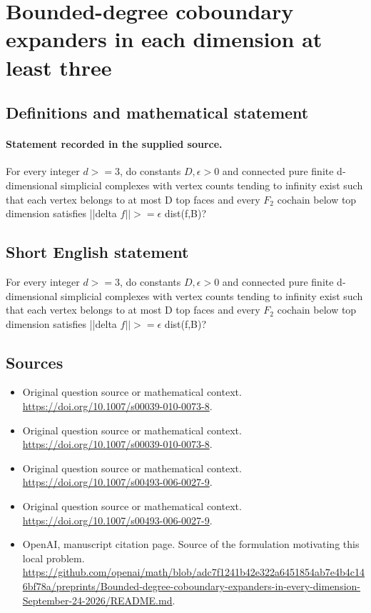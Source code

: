 \documentclass[11pt]{article}
\begin{document}
\section*{Bounded-degree coboundary expanders in each dimension at least three}\label{statement}
\subsection{Definitions and mathematical statement}
\paragraph{Statement recorded in the supplied source.}
For every integer $d>=3$, do constants $D,\epsilon >0$ and connected pure finite d-dimensional simplicial complexes with vertex counts tending to infinity exist such that each vertex belongs to at most D top faces and every $F_2$ cochain below top dimension satisfies ||delta $f||>=\epsilon $ dist(f,B)?
\subsection{Short English statement}
For every integer $d>=3$, do constants $D,\epsilon >0$ and connected pure finite d-dimensional simplicial complexes with vertex counts tending to infinity exist such that each vertex belongs to at most D top faces and every $F_2$ cochain below top dimension satisfies ||delta $f||>=\epsilon $ dist(f,B)?
\subsection{Sources}
\begin{itemize}
\item[S1] Original question source or mathematical context.
\url{https://doi.org/10.1007/s00039-010-0073-8}.
\item[S2] Original question source or mathematical context.
\url{https://doi.org/10.1007/s00039-010-0073-8}.
\item[S3] Original question source or mathematical context.
\url{https://doi.org/10.1007/s00493-006-0027-9}.
\item[S4] Original question source or mathematical context.
\url{https://doi.org/10.1007/s00493-006-0027-9}.
\item[S5] OpenAI, manuscript citation page. Source of the formulation motivating this local problem.
\url{https://github.com/openai/math/blob/adc7f1241b42e322a6451854ab7e4b4c146bf78a/preprints/Bounded-degree-coboundary-expanders-in-every-dimension-September-24-2026/README.md}.
\end{itemize}
\end{document}
